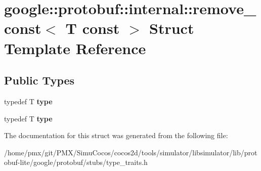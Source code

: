 \hypertarget{structgoogle_1_1protobuf_1_1internal_1_1remove__const_3_01T_01const_01_4}{}\section{google\+:\+:protobuf\+:\+:internal\+:\+:remove\+\_\+const$<$ T const $>$ Struct Template Reference}
\label{structgoogle_1_1protobuf_1_1internal_1_1remove__const_3_01T_01const_01_4}
\subsection*{Public Types}
\begin{DoxyCompactItemize}
\item 
\mbox{\label{structgoogle_1_1protobuf_1_1internal_1_1remove__const_3_01T_01const_01_4_a2c06653bc106a7eaa35abdc4c31aa823}} 
typedef T {\bfseries type}
\item 
\mbox{\label{structgoogle_1_1protobuf_1_1internal_1_1remove__const_3_01T_01const_01_4_a2c06653bc106a7eaa35abdc4c31aa823}} 
typedef T {\bfseries type}
\end{DoxyCompactItemize}


The documentation for this struct was generated from the following file\+:\begin{DoxyCompactItemize}
\item 
/home/pmx/git/\+P\+M\+X/\+Simu\+Cocos/cocos2d/tools/simulator/libsimulator/lib/protobuf-\/lite/google/protobuf/stubs/type\+\_\+traits.\+h\end{DoxyCompactItemize}
